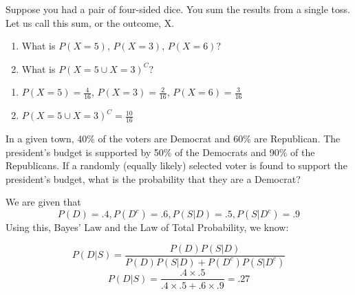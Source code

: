\documentclass[
]{article}
\begin{document}
\setcounter{section}{4}

\begin{exercise}[Probability]
\protect\hypertarget{exr:prob1}{}\label{exr:prob1}

Suppose you had a pair of four-sided dice. You sum the results from a single toss. Let us call this sum, or the outcome, X.

\begin{enumerate}
\def\labelenumi{\arabic{enumi}.}
\item
  What is \(P(X = 5)\), \(P(X = 3)\), \(P(X = 6)\)?
\item
  What is \(P(X=5 \cup X = 3)^C\)?
\end{enumerate}

\end{exercise}

\begin{answer}
\noindent
\begin{enumerate}
\item $P(X = 5) = \frac{4}{16}$, $P(X = 3) = \frac{2}{16}$, $P(X = 6) = \frac{3}{16}$
\item $P(X=5 \cup X = 3)^C = \frac{10}{16}$
\end{enumerate}
\end{answer}

\begin{example}
\protect\hypertarget{exm:bayesrule}{}\label{exm:bayesrule}In a given town, 40\% of the voters are Democrat and 60\% are Republican. The president's budget is supported by 50\% of the Democrats and 90\% of the Republicans. If a randomly (equally likely) selected voter is found to support the president's budget, what is the probability that they are a Democrat?
\end{example}

\begin{answer}
We are given that
$$P(D) = .4, P(D^c) = .6, P(S|D) = .5, P(S|D^c) = .9$$
Using this, Bayes' Law and the Law of Total Probability, we know: 

$$P(D|S) = \frac{P(D)P(S|D)}{P(D)P(S|D) + P(D^c)P(S|D^c)}$$
$$P(D|S) = \frac{.4 \times .5}{.4 \times .5 + .6 \times .9 } = .27$$
\end{answer}
\end{document}
